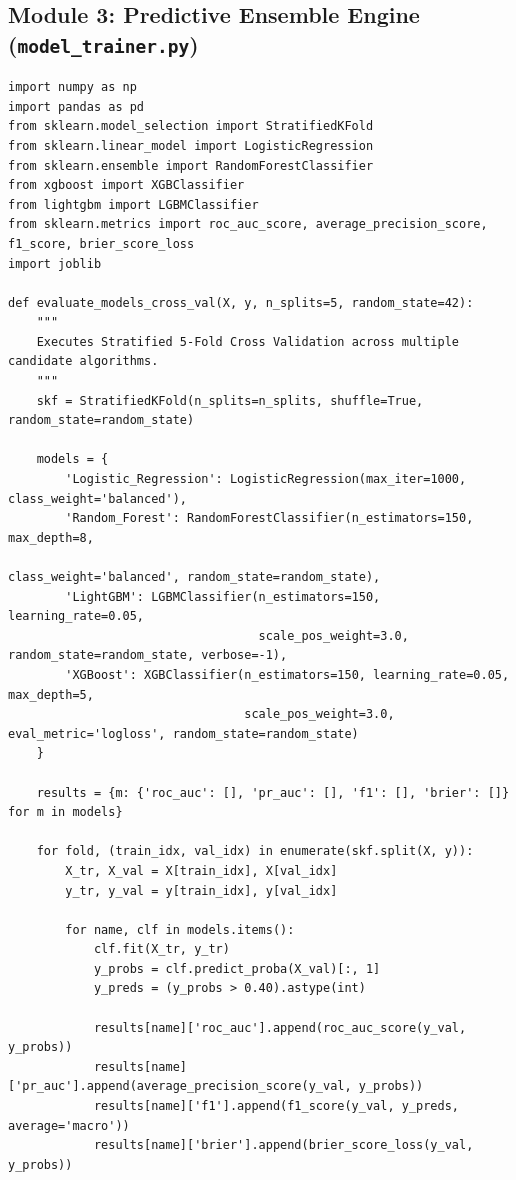 \documentclass[11pt, a4paper]{article}
\begin{document}
\subsection{Module 3: Predictive Ensemble Engine (\texttt{model\_trainer.py})}
\begin{verbatim}
import numpy as np
import pandas as pd
from sklearn.model_selection import StratifiedKFold
from sklearn.linear_model import LogisticRegression
from sklearn.ensemble import RandomForestClassifier
from xgboost import XGBClassifier
from lightgbm import LGBMClassifier
from sklearn.metrics import roc_auc_score, average_precision_score, f1_score, brier_score_loss
import joblib

def evaluate_models_cross_val(X, y, n_splits=5, random_state=42):
    """
    Executes Stratified 5-Fold Cross Validation across multiple candidate algorithms.
    """
    skf = StratifiedKFold(n_splits=n_splits, shuffle=True, random_state=random_state)
    
    models = {
        'Logistic_Regression': LogisticRegression(max_iter=1000, class_weight='balanced'),
        'Random_Forest': RandomForestClassifier(n_estimators=150, max_depth=8, 
                                                class_weight='balanced', random_state=random_state),
        'LightGBM': LGBMClassifier(n_estimators=150, learning_rate=0.05, 
                                   scale_pos_weight=3.0, random_state=random_state, verbose=-1),
        'XGBoost': XGBClassifier(n_estimators=150, learning_rate=0.05, max_depth=5, 
                                 scale_pos_weight=3.0, eval_metric='logloss', random_state=random_state)
    }
    
    results = {m: {'roc_auc': [], 'pr_auc': [], 'f1': [], 'brier': []} for m in models}
    
    for fold, (train_idx, val_idx) in enumerate(skf.split(X, y)):
        X_tr, X_val = X[train_idx], X[val_idx]
        y_tr, y_val = y[train_idx], y[val_idx]
        
        for name, clf in models.items():
            clf.fit(X_tr, y_tr)
            y_probs = clf.predict_proba(X_val)[:, 1]
            y_preds = (y_probs > 0.40).astype(int)
            
            results[name]['roc_auc'].append(roc_auc_score(y_val, y_probs))
            results[name]['pr_auc'].append(average_precision_score(y_val, y_probs))
            results[name]['f1'].append(f1_score(y_val, y_preds, average='macro'))
            results[name]['brier'].append(brier_score_loss(y_val, y_probs))
            

\end{verbatim}
\end{document}
